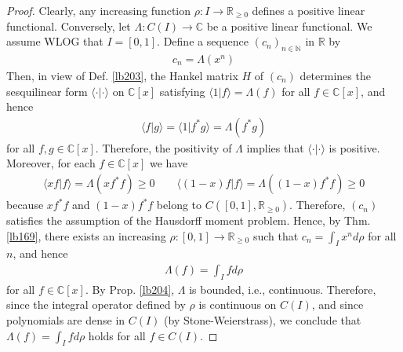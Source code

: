 \documentclass[12pt,b5paper,notitlepage]{article}
\theoremstyle{definition}
\theoremstyle{plain}
\newcommand{\bk}[1]{\langle {#1}\rangle}
\newcommand{\Cbb}{\mathbb C}
\newcommand{\Nbb}{\mathbb N}
\newcommand{\Rbb}{\mathbb R}
\numberwithin{equation}{section}
\begin{document}
\begin{proof}
Clearly, any increasing function $\rho:I\rightarrow\Rbb_{\geq0}$ defines a positive linear functional. Conversely, let $\Lambda:C(I)\rightarrow\Cbb$ be a positive linear functional. We assume WLOG that $I=[0,1]$. Define a sequence $(c_n)_{n\in\Nbb}$ in $\Rbb$ by
\begin{align*}
c_n=\Lambda(x^n)
\end{align*}
Then, in view of Def. \ref{lb203}, the Hankel matrix $H$ of $(c_n)$ determines the sesquilinear form $\bk{\cdot|\cdot}$ on $\Cbb[x]$ satisfying $\bk{1|f}=\Lambda(f)$ for all $f\in\Cbb[x]$, and hence
\begin{align*}
\bk{f|g}=\bk{1|f^*g}=\Lambda(f^*g)
\end{align*}
for all $f,g\in\Cbb[x]$. Therefore, the positivity of $\Lambda$ implies that $\bk{\cdot|\cdot}$ is positive. Moreover, for each $f\in\Cbb[x]$ we have
\begin{align*}
\bk{xf|f}=\Lambda(xf^*f)\geq0\qquad \bk{(1-x)f|f}=\Lambda((1-x)f^*f)\geq0
\end{align*}
because $xf^*f$ and $(1-x)f^*f$ belong to $C([0,1],\Rbb_{\geq0})$. Therefore, $(c_n)$ satisfies the assumption of the Hausdorff moment problem. Hence, by Thm. \ref{lb169}, there exists an increasing $\rho:[0,1]\rightarrow\Rbb_{\geq0}$ such that $c_n=\int_Ix^nd\rho$ for all $n$, and hence
\begin{align*}
\Lambda(f)=\int_Ifd\rho
\end{align*}
for all $f\in\Cbb[x]$. By Prop. \ref{lb204}, $\Lambda$ is bounded, i.e., continuous. Therefore, since the integral operator defined by $\rho$ is continuous on $C(I)$, and since polynomials are dense in $C(I)$ (by Stone-Weierstrass), we conclude that $\Lambda(f)=\int_Ifd\rho$ holds for all $f\in C(I)$.
\end{proof}
\end{document}
